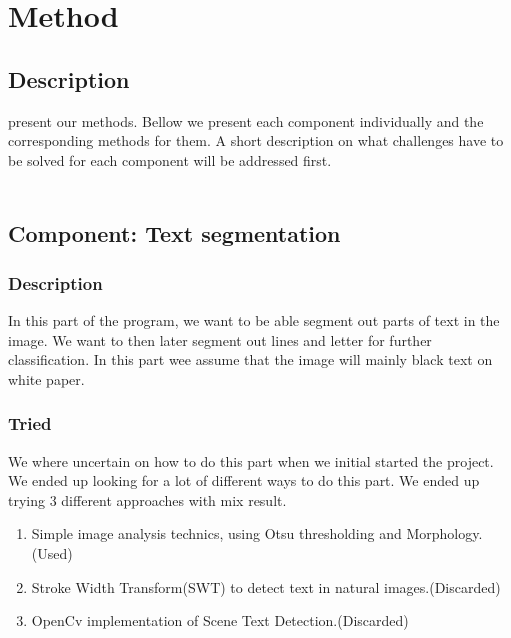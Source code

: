 \documentclass[Report.tex]{subfiles}
\begin{document}
\chapter{Method}
\label{sec:Method}
\section{Description}
present our methods. Bellow we present each component individually and the
corresponding methods for them. A short description on what challenges have to
be solved for each component will be addressed first. \\ \\


\section{Component: Text segmentation}
\label{Method:Text_segmentation}

\subsection{Description}
In this part of the program, we want to be able segment out parts of text in the image. We want to then later segment out lines and letter for further classification. In this part wee assume that the image will mainly black text on white paper.

\subsection{Tried}
We where uncertain on how to do this part when we initial started the project. We ended up looking for a lot of different ways to do this part. We ended up trying 3 different approaches with mix result.
\begin{enumerate}
  \item Simple image analysis technics, using Otsu thresholding and Morphology.(Used)
  \item Stroke Width Transform(SWT) to detect text in natural images.(Discarded)
  \item OpenCv implementation of Scene Text Detection.(Discarded)
\end{enumerate}
\end{document}
